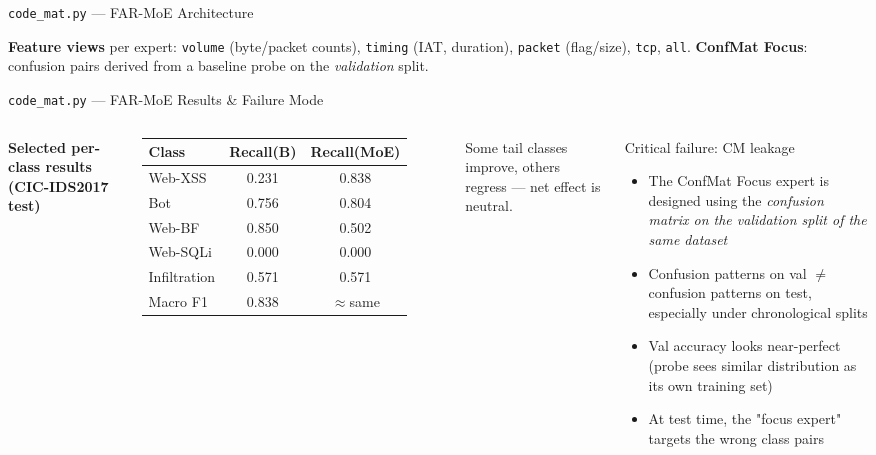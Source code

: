 \documentclass[aspectratio=169,10pt]{beamer}
\newcommand{\good}[1]{\cellcolor{good}#1}
\newcommand{\bad}[1]{\cellcolor{bad}#1}
\newcommand{\neu}[1]{\cellcolor{neutral}#1}
\begin{document}
\begin{frame}{\texttt{code\_mat.py} --- FAR-MoE Architecture}
\begin{center}
\begin{tikzpicture}
  \end{tikzpicture}
  \end{center}
  \vspace{-4pt}
  \scriptsize
  \textbf{Feature views} per expert: \texttt{volume} (byte/packet counts),
  \texttt{timing} (IAT, duration), \texttt{packet} (flag/size),
  \texttt{tcp}, \texttt{all}.
  \quad \textbf{ConfMat Focus}: confusion pairs derived from a baseline probe
  on the \emph{validation} split.
\end{frame}

\begin{frame}{\texttt{code\_mat.py} --- FAR-MoE Results \& Failure Mode}
  \begin{columns}[T]
      \textbf{Selected per-class results (CIC-IDS2017 test)}
      \footnotesize
      \renewcommand{\arraystretch}{1.2}
      \begin{tabular}{lcc}
        \toprule
        Class & Recall(B) & Recall(MoE) \\
        \midrule
        Web-XSS      & 0.231 & \good{0.838} \\
        Bot          & 0.756 & \good{0.804} \\
        Web-BF       & 0.850 & \bad{0.502} \\
        Web-SQLi     & 0.000 & 0.000 \\
        Infiltration & 0.571 & 0.571 \\
        \midrule
        Macro F1     & 0.838 & \neu{$\approx$same} \\
        \bottomrule
      \end{tabular}
      \normalsize
      \vspace{6pt}
      Some tail classes improve, others regress --- net effect is neutral.
      \begin{alertblock}{Critical failure: CM leakage}
        \begin{itemize}
          \item The ConfMat Focus expert is designed using the \emph{confusion
                matrix on the validation split of the same dataset}
          \item Confusion patterns on val $\neq$ confusion patterns on test,
                especially under chronological splits
          \item Val accuracy looks near-perfect
                (probe sees similar distribution as its own training set)
          \item At test time, the "focus expert" targets the wrong class pairs
        \end{itemize}
      \end{alertblock}
  \end{columns}
\end{frame}
\end{document}
